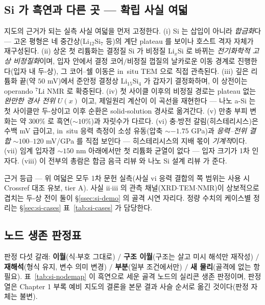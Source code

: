 \subsection{Si 가 흑연과 다른 곳 --- 확립 사실 여덟}\label{ssec:si-eight}
지도의 근거가 되는 실측 사실 여덟을 먼저 고정한다. (i) Si 는 삽입이 아니라 \emph{합금화}다 --- 고온 평형은
네 중간상(Li$_{12}$Si$_7$ 등)의 계단 plateau 를 보이나\cite{wen_huggins1981} 호스트 격자 자체가
재구성된다. (ii) 상온 첫 리튬화는 결정질 Si 가 비정질 Li$_x$Si 로 바뀌는 \emph{전기화학적 고상
비정질화}이며, 입자 안에서 결정 코어$/$비정질 껍질의 날카로운 이동 경계로 진행한다(입자 내
두-상)\cite{limthongkul2003,li_dahn2007}, 그 코어--쉘 이동은 in~situ TEM 으로 직접 관측된다\cite{mcdowell_coreshell2013}.
(iii) 깊은 리튬화 끝(약 $50$ mV)에서 준안정 결정상 Li$_{15}$Si$_4$ 가 갑자기 결정화하며\cite{obrovac_christensen2004},
이 상전이는 operando $^7$Li NMR 로 확증된다\cite{ogata_nmr2014}. (iv) 첫 사이클 이후의 비정질 경로는
plateau 없는 \emph{완만한 경사 전위} $U(x)$ 이고, 제일원리 계산이 이 곡선을 재현한다\cite{chevrier_dahn2009}
--- 나노 a-Si 는 첫 사이클만 두-상이고 이후 순환은 solid-solution 경사로 옮겨간다\cite{wang_asi2013}. (v)
만충 부피 변화는 약 $300\%$ 로\cite{beaulieu2001} 흑연($\sim10\%$)과 자릿수가 다르다. (vi)
충$\cdot$방전 갈림(히스테리시스)은 수백 mV 급이고, in~situ 응력 측정이 소성 유동(압축 $\sim-1.75$
GPa)과 \emph{응력--전위 결합} $\sim100$--$120$ mV/GPa 를 직접 보인다\cite{sethuraman_stressevo2010,
sethuraman_stresspot2010} --- 히스테리시스의 지배 몫이 \emph{기계적}이다. (vii) 임계 입자경 $\sim150$ nm
아래에서만 첫 리튬화 균열이 없다 --- 입자 크기가 1차 인자다\cite{liu_sizefracture2012}. (viii) 이 전부의
총람은 합금 음극 리뷰\cite{obrovac_chevrier2014} 와 나노 Si 설계 리뷰\cite{mcdowell_review2013} 가 준다.
\begin{srcbox}
근거 등급 --- 위 여덟은 모두 1차 문헌 실측(사실 vi 응력 결합의 쪽 범위는 사용 시 Crossref 대조 유보,
tier A). 사실 ii$\cdot$iii 의 관측 채널(XRD$\cdot$TEM$\cdot$NMR)이 상보적으로 겹치는 두-상 전이 둘이
\S\ref{ssec:si-demo} 의 골격 시연 자리다. 정량 수치의 케이스별 정리는 \S\ref{sec:si-cases}
표~\ref{tab:si-cases} 가 담당한다.
\end{srcbox}

\subsection{노드 생존 판정표}\label{ssec:si-nodemap}
판정 다섯 갈래: \textbf{이월}(식$\cdot$부호 그대로) $/$ \textbf{구조 이월}(구조는 살고 미시 해석만 재작성) $/$
\textbf{재해석}(형식 유지, 변수 의미 변경) $/$ \textbf{부분}(일부 조건에서만) $/$ \textbf{새 물리}(골격에 없는 항
필요). 표~\ref{tab:si-nodemap} 이 흑연으로 세운 골격 노드의 실리콘 생존 판정이며, 판정 열은 Chapter 1
부록 예비 지도의 결론을 본문 결과 사슬 순서로 옮긴 것이다(판정 자체는 불변).

